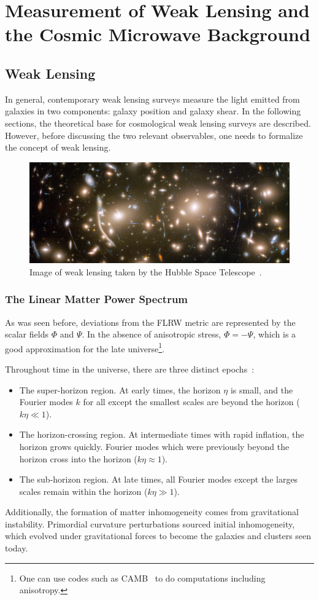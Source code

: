 \chapter{Measurement of Weak Lensing and the Cosmic Microwave Background}
\section{Weak Lensing}
In general, contemporary weak lensing surveys measure the light emitted from galaxies in two components: galaxy position and galaxy shear. In the following sections, the theoretical base for cosmological weak lensing surveys are described. However, before discussing the two relevant observables, one needs to formalize the concept of weak lensing.
\begin{figure}[ht]
	\centering
	\includegraphics[width=\textwidth]{plots/hubble_weak_lensing.png}
	\caption{Image of weak lensing taken by the Hubble Space Telescope~\cite{hubble_lensing}.}
	\label{fig:weak_lensing}
\end{figure}
\subsection{The Linear Matter Power Spectrum}
As was seen before, deviations from the FLRW metric are represented by the scalar fields $\Phi$ and $\Psi$. In the absence of anisotropic stress, $\Phi=-\Psi$, which is a good approximation for the late universe\footnote{One can use codes such as \textsc{CAMB}~\cite{antony_lewis_camb_nodate} to do computations including anisotropy.}. 

Throughout time in the universe, there are three distinct epochs~\cite{scott_dodelson_modern_2021}:
\begin{itemize}
	\item The super-horizon region. At early times, the horizon $\eta$ is small, and the Fourier modes $k$ for all except the smallest scales are beyond the horizon ($k\eta\ll1$).
	\item The horizon-crossing region. At intermediate times with rapid inflation, the horizon grows quickly. Fourier modes which were previously beyond the horizon cross into the horizon ($k\eta\approx1$).
	\item The sub-horizon region. At late times, all Fourier modes except the larges scales remain within the horizon ($k\eta\gg1$).
\end{itemize}
Additionally, the formation of matter inhomogeneity comes from gravitational instability. Primordial curvature perturbations sourced initial inhomogeneity, which evolved under gravitational forces to become the galaxies and clusters seen today.

